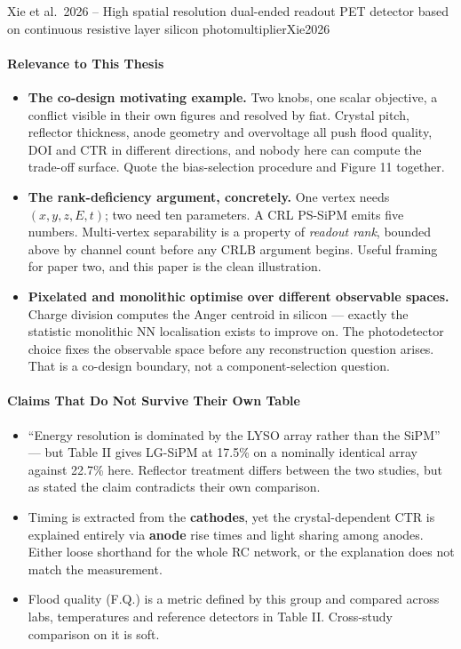 \begin{papernote}{Xie et al.\ 2026 -- High spatial resolution dual-ended readout PET detector based on continuous resistive layer silicon photomultiplier}{Xie2026}
\paragraph{Relevance to This Thesis}
\begin{itemize}
	\item \textbf{The co-design motivating example.} Two knobs, one scalar
		objective, a conflict visible in their own figures and resolved by
		fiat. Crystal pitch, reflector thickness, anode geometry and overvoltage
		all push flood quality, DOI and CTR in different directions, and nobody
		here can compute the trade-off surface. Quote the bias-selection
		procedure and Figure 11 together.
	\item \textbf{The rank-deficiency argument, concretely.} One vertex needs
		$(x, y, z, E, t)$; two need ten parameters. A CRL PS-SiPM emits five
		numbers. Multi-vertex separability is a property of \emph{readout rank},
		bounded above by channel count before any CRLB argument begins. Useful
		framing for paper two, and this paper is the clean illustration.
	\item \textbf{Pixelated and monolithic optimise over different observable
		spaces.} Charge division computes the Anger centroid in silicon ---
		exactly the statistic monolithic NN localisation exists to improve on.
		The photodetector choice fixes the observable space before any
		reconstruction question arises. That is a co-design boundary, not a
		component-selection question.
\end{itemize}
 
\paragraph{Claims That Do Not Survive Their Own Table}
\begin{itemize}
	\item ``Energy resolution is dominated by the LYSO array rather than the
		SiPM'' --- but Table II gives LG-SiPM at 17.5\% on a nominally identical
		 array against 22.7\% here.
		Reflector treatment differs between the two studies, but as stated the
		claim contradicts their own comparison.
	\item Timing is extracted from the \textbf{cathodes}, yet the
		crystal-dependent CTR is explained entirely via \textbf{anode} rise
		times and light sharing among anodes. Either loose shorthand for the
		whole RC network, or the explanation does not match the measurement.
	\item Flood quality (F.Q.) is a metric defined by this group and compared
		across labs, temperatures and reference detectors in Table II.
		Cross-study comparison on it is soft.
\end{itemize}
 
\end{papernote}
 
